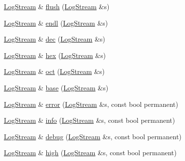 \begin{DoxyCompactItemize}
\item 
\hyperlink{classkisscpp_1_1_log_stream}{Log\-Stream} \& \hyperlink{namespacekisscpp_1_1manip_a416806b7a937a2437ffadb9b523e1cf3}{flush} (\hyperlink{classkisscpp_1_1_log_stream}{Log\-Stream} \&s)
\item 
\hyperlink{classkisscpp_1_1_log_stream}{Log\-Stream} \& \hyperlink{namespacekisscpp_1_1manip_ad682f16cb474bc7ff2c991ad2c45db66}{endl} (\hyperlink{classkisscpp_1_1_log_stream}{Log\-Stream} \&s)
\item 
\hyperlink{classkisscpp_1_1_log_stream}{Log\-Stream} \& \hyperlink{namespacekisscpp_1_1manip_a5d7a175caf56eafe6f39469a0b0ac034}{dec} (\hyperlink{classkisscpp_1_1_log_stream}{Log\-Stream} \&s)
\item 
\hyperlink{classkisscpp_1_1_log_stream}{Log\-Stream} \& \hyperlink{namespacekisscpp_1_1manip_a1463e1f81c1a4a6c6e19e883f1160059}{hex} (\hyperlink{classkisscpp_1_1_log_stream}{Log\-Stream} \&s)
\item 
\hyperlink{classkisscpp_1_1_log_stream}{Log\-Stream} \& \hyperlink{namespacekisscpp_1_1manip_a1d9bd6b119890c9396e1dce048c07032}{oct} (\hyperlink{classkisscpp_1_1_log_stream}{Log\-Stream} \&s)
\item 
\hyperlink{classkisscpp_1_1_log_stream}{Log\-Stream} \& \hyperlink{namespacekisscpp_1_1manip_a3a365ff3909fcd0d76c2f7fa4da3b2b0}{base} (\hyperlink{classkisscpp_1_1_log_stream}{Log\-Stream} \&s)
\item 
\hyperlink{classkisscpp_1_1_log_stream}{Log\-Stream} \& \hyperlink{namespacekisscpp_1_1manip_ac2256889dabb1c6247c14dc8385b4d9b}{error} (\hyperlink{classkisscpp_1_1_log_stream}{Log\-Stream} \&s, const bool permanent)
\item 
\hyperlink{classkisscpp_1_1_log_stream}{Log\-Stream} \& \hyperlink{namespacekisscpp_1_1manip_a0fe4bf2c9708816662d11a09ad6d2748}{info} (\hyperlink{classkisscpp_1_1_log_stream}{Log\-Stream} \&s, const bool permanent)
\item 
\hyperlink{classkisscpp_1_1_log_stream}{Log\-Stream} \& \hyperlink{namespacekisscpp_1_1manip_a35ce61527ad7974643c8841ed9177d7c}{debug} (\hyperlink{classkisscpp_1_1_log_stream}{Log\-Stream} \&s, const bool permanent)
\item 
\hyperlink{classkisscpp_1_1_log_stream}{Log\-Stream} \& \hyperlink{namespacekisscpp_1_1manip_adb1fe27024e605bfbfdd2411487c5163}{high} (\hyperlink{classkisscpp_1_1_log_stream}{Log\-Stream} \&s, const bool permanent)
\item 

\end{DoxyCompactItemize}
